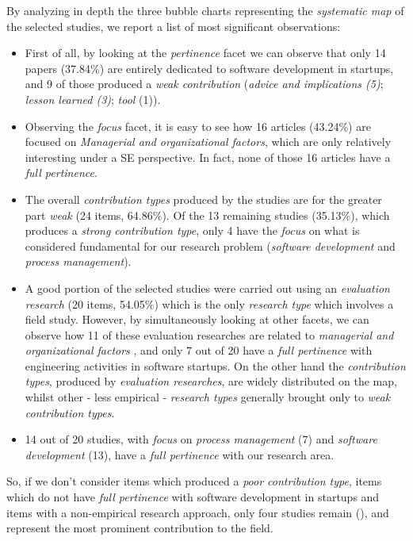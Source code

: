 \documentclass[final,5p,times,twocolumn]{elsarticle}
\begin{document}
\twocolumn

By analyzing  in depth the three bubble charts representing the  \textit{systematic map} of the selected studies, we report a list of most significant observations:


\begin{itemize}

\item First of all, by looking at the \textit{pertinence} facet we can observe that only 14 papers (37.84\%)  are entirely dedicated to software development in startups, and 9 of those produced a \textit{weak contribution} (\textit{advice and implications (5)}; \textit{lesson learned (3)}; \textit{tool} (1)).
\item  Observing the \textit{focus} facet, it is easy to see how 16 articles (43.24\%) are focused on \textit{Managerial and organizational factors}, which are only relatively interesting under a SE perspective. In fact, none of those 16 articles have a \textit{full pertinence}.
\item The overall \textit{contribution types} produced by the studies are for the greater part \textit{weak} (24 items, 64.86\%). Of the 13 remaining studies (35.13\%), which produces a \textit{strong contribution type}, only 4 have the \textit{focus} on what is considered fundamental for our research problem (\textit{software development} and \textit{process management}).
\item A good portion of the selected studies were carried out using an \textit{evaluation research} (20 items, 54.05\%)  which is the only \textit{research type} which involves a field study. However, by simultaneously looking at other facets, we can observe how 11 of these evaluation researches are related to \textit{managerial and organizational factors} , and only 7 out of 20 have a \textit{full pertinence} with engineering activities in software startups. On the other hand the \textit{contribution types}, produced by  \textit{evaluation researches}, are widely distributed on the map, whilst other - less empirical - \textit{research types} generally brought only to \textit{weak contribution types}.
\item 14 out of 20 studies, with \textit{focus} on \textit{process management} (7) and \textit{software development} (13), have a \textit{full pertinence} with our research area.
\end{itemize}


So, if we don't consider items which produced a \textit{poor contribution type}, items which do not have \textit{full pertinence} with software development in startups and items with a non-empirical research approach, only four studies remain (\cite{Coleman2008,Coleman2008a,Coleman2007,Kajko-Mattsson2008}), and represent the most prominent contribution to the field.
\end{document}
